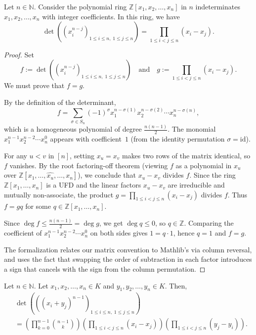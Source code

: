\begin{lemma}
\label{lem.det.vander.a.pol}
\leantarget
\leanok
Let $n \in \mathbb{N}$. Consider the polynomial ring
$\mathbb{Z}[x_1, x_2, \ldots, x_n]$ in $n$ indeterminates
$x_1, x_2, \ldots, x_n$ with integer coefficients. In this ring, we have
\begin{equation}
  \det\left( \left( x_i^{n-j} \right)_{1 \leq i \leq n,\; 1 \leq j \leq n} \right)
  = \prod_{1 \leq i < j \leq n} (x_i - x_j).
  \label{eq.lem.det.vander.a.pol.1}
\end{equation}
\end{lemma}

\begin{proof}
Set
\[
  f := \det\left( \left( x_i^{n-j} \right)_{1 \leq i \leq n,\; 1 \leq j \leq n} \right)
  \quad \text{and} \quad
  g := \prod_{1 \leq i < j \leq n} (x_i - x_j).
\]
We must prove that $f = g$.

By the definition of the determinant,
\[
  f = \sum_{\sigma \in S_n} (-1)^\sigma
      x_1^{n - \sigma(1)} x_2^{n - \sigma(2)} \cdots x_n^{n - \sigma(n)},
\]
which is a homogeneous polynomial of degree $\frac{n(n-1)}{2}$.
The monomial $x_1^{n-1} x_2^{n-2} \cdots x_n^0$ appears with coefficient~$1$
(from the identity permutation $\sigma = \mathrm{id}$).

For any $u < v$ in $[n]$, setting $x_u = x_v$ makes two rows of the matrix
identical, so $f$ vanishes. By the root factoring-off theorem (viewing $f$ as a
polynomial in $x_u$ over
$\mathbb{Z}[x_1, \ldots, \widehat{x_u}, \ldots, x_n]$), we conclude that
$x_u - x_v$ divides $f$. Since the ring
$\mathbb{Z}[x_1, \ldots, x_n]$ is a UFD and the linear factors $x_u - x_v$
are irreducible and mutually non-associate, the product
$g = \prod_{1 \leq i < j \leq n} (x_i - x_j)$ divides $f$. Thus $f = gq$
for some $q \in \mathbb{Z}[x_1, \ldots, x_n]$.

Since $\deg f \leq \frac{n(n-1)}{2} = \deg g$, we get $\deg q \leq 0$, so
$q \in \mathbb{Z}$. Comparing the coefficient of $x_1^{n-1} x_2^{n-2} \cdots x_n^0$
on both sides gives $1 = q \cdot 1$, hence $q = 1$ and $f = g$.

The formalization relates our matrix convention to Mathlib's via column reversal,
and uses the fact that swapping the order of subtraction in each factor introduces
a sign that cancels with the sign from the column permutation.
\end{proof}

\begin{proposition}
\label{prop.det.(xi+yj)n-1}
\leantarget
\leanok
Let $n \in \mathbb{N}$. Let $x_1, x_2, \ldots, x_n \in K$ and
$y_1, y_2, \ldots, y_n \in K$. Then,
\begin{align*}
  & \det\left( \left( (x_i + y_j)^{n-1} \right)_{1 \leq i \leq n,\; 1 \leq j \leq n} \right) \\
  &= \left( \prod_{k=0}^{n-1} \binom{n-1}{k} \right)
     \left( \prod_{1 \leq i < j \leq n} (x_i - x_j) \right)
     \left( \prod_{1 \leq i < j \leq n} (y_j - y_i) \right).
\end{align*}
\end{proposition}

